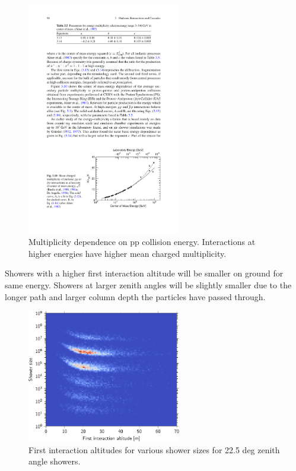 \begin{figure}
    \centering
    \includegraphics[width=0.6\textwidth]{plots/cosmic-rays/multiplicity}
    \caption{Multiplicity dependence on pp collision energy. Interactions at higher energies have higher mean charged multiplicity.}
    \label{fig:multiplicity}
\end{figure}

Showers with a higher first interaction altitude will be smaller on ground for same energy. Showers at larger zenith angles will be slightly smaller due to the longer path and larger column depth the particles have passed through.

\begin{figure}
    \centering
    \includegraphics[width=0.6\textwidth]
                    {plots/cosmic-rays/interaction_altitude_v_size}
    \caption{First interaction altitudes for various shower sizes for 22.5 deg zenith angle showers.}
    \label{fig:interaction_altitude_v_size}
\end{figure}


